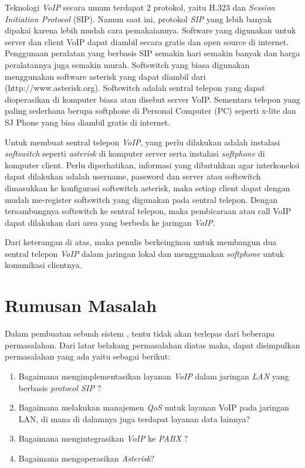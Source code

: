 \documentclass{jtetiproposalskripsi}
\begin{document}
Teknologi \emph{VoIP} secara umum terdapat 2 protokol, yaitu H.323 dan \emph{Session Initiation Protocol} (SIP). Namun saat ini, protokol \emph{SIP} yang lebih banyak  dipakai  karena  lebih  mudah  cara  pemakaiannya.  Software yang digunakan  untuk  server dan  client VoIP  dapat  diambil  secara  gratis  dan open source di internet. Penggunaan peralatan  yang  berbasis SIP semakin hari semakin banyak dan harga peralatannya juga semakin murah. Softswitch yang biasa digunakan menggunakan software asterisk yang dapat diambil dari (http://www.asterisk.org).  Softswitch adalah  sentral  telepon  yang  dapat dioperasikan  di  komputer biasa atau disebut server VoIP. Sementara telepon  yang paling sederhana  berupa  softphone di Personal Computer (PC) seperti x-lite dan SJ Phone yang bisa diambil gratis di internet.

Untuk membuat sentral telepon \emph{VoIP}, yang perlu dilakukan adalah instalasi \emph{softswitch} seperti \emph{asterisk} di komputer server serta instalasi \emph{softphone} di komputer client. Perlu diperhatikan, informasi yang  dibutuhkan  agar  interkoneksi  dapat  dilakukan  adalah  username, password dan  server atau softswitch dimasukkan  ke  konfigurasi  softswitch asterisk,  maka  setiap  client dapat  dengan  mudah  me-register  softswitch yang digunakan pada sentral telepon. Dengan tersambungnya softswitch ke sentral  telepon,  maka  pembicaraan atau call VoIP  dapat  dilakukan  dari area yang berbeda ke jaringan \emph{VoIP}.
	
Dari keterangan di atas, maka penulis berkeinginan untuk membangun dua sentral telepon \emph{VoIP}  dalam jaringan lokal dan menggunakan \emph{softphone} untuk komunikasi clientnya.


\section{Rumusan Masalah}
Dalam pembuatan sebuah sistem , tentu tidak akan terlepas dari beberapa permasalahan. Dari latar belakang permasalahan diatas maka, dapat disimpulkan permasalahan yang ada yaitu sebagai berikut:

\begin{enumerate}
\item Bagaimana mengimplementasikan layanan \emph{VoIP} dalam jaringan \emph{LAN} yang berbasis \emph{protocol SIP} ?
\item Bagaimana melakukan manajemen \emph{QoS} untuk layanan VoIP pada jaringan LAN, di mana di dalamnya juga terdapat layanan data lainnya?
\item Bagaimana mengintegrasikan \emph{VoIP} ke \emph{PABX} ?
\item Bagaimana mengoperasikan \emph{Asterisk}?
\end{enumerate}
\end{document}
